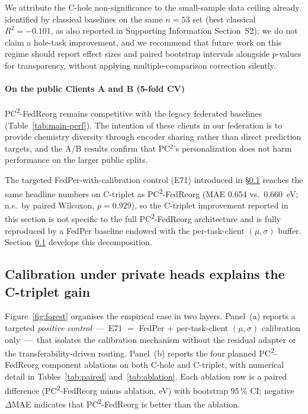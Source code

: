 \documentclass[11pt,a4paper]{article}
\newcommand{\PC}{PC\textsuperscript{2}-FedReorg}
\begin{document}
We attribute the C-hole non-significance to the small-sample data ceiling already identified by classical baselines on the same $n = 53$ set (best classical $R^2 = -0.101$, as also reported in Supporting Information Section~S2); we do not claim a hole-task improvement, and we recommend that future work on this regime should report effect sizes and paired bootstrap intervals alongside $p$-values for transparency, without applying multiple-comparison correction silently.

\paragraph{On the public Clients A and B (5-fold CV)} \PC{} remains competitive with the legacy federated baselines (Table~\ref{tab:main-perf}). The intention of these clients in our federation is to provide chemistry diversity through encoder sharing rather than direct prediction targets, and the A/B results confirm that PC$^2$'s personalization does not harm performance on the larger public splits.

The targeted FedPer-with-calibration control (E71) introduced in \S\ref{sec:ablation} reaches the same headline numbers on C-triplet as \PC{} (MAE \SI{0.654}{} vs.\ \SI{0.660}{\eV}; n.s.\ by paired Wilcoxon, $p = 0.929$), so the C-triplet improvement reported in this section is not specific to the full \PC{} architecture and is fully reproduced by a FedPer baseline endowed with the per-task-client $(\mu, \sigma)$ buffer. Section~\ref{sec:ablation} develops this decomposition.

\subsection{Calibration under private heads explains the C-triplet gain}\label{sec:ablation}

Figure~\ref{fig:forest} organises the empirical case in two layers. Panel~(a) reports a targeted \emph{positive control}~---~E71 $=$ FedPer $+$ per-task-client $(\mu, \sigma)$ calibration only~---~that isolates the calibration mechanism without the residual adapter or the transferability-driven routing. Panel~(b) reports the four planned \PC{} component ablations on both C-hole and C-triplet, with numerical detail in Tables~\ref{tab:paired} and~\ref{tab:ablation}. Each ablation row is a paired difference (\PC{} minus ablation, eV) with bootstrap 95\,\% CI; negative $\Delta$MAE indicates that \PC{} is better than the ablation.
\end{document}
